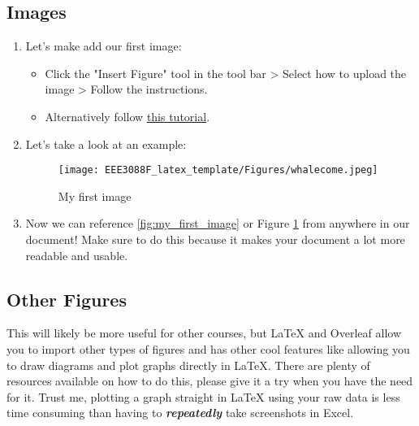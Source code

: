 \documentclass[class=report,11pt,crop=false]{standalone}
\begin{document}
\subsection{Images}
\begin{enumerate}
    \item Let's make add our first image:
        \begin{itemize}
            \item Click the "Insert Figure" tool in the tool bar > Select how to upload the image > Follow the instructions.
            \item Alternatively follow \href{https://www.overleaf.com/learn/latex/Inserting_Images}{this tutorial}.
        \end{itemize}
    \item Let's take a look at an example:        
            \begin{figure}
                \centering
                \texttt{[image: EEE3088F\_latex\_template/Figures/whalecome.jpeg]}
                \caption{My first image}
                \label{fig:my_first_image}
            \end{figure}
    \item Now we can reference \autoref{fig:my_first_image} or Figure \ref{fig:my_first_image} from anywhere in our document! Make sure to do this because it makes your document a lot more readable and usable.        
\end{enumerate}

\subsection{Other Figures}
This will likely be more useful for other courses, but LaTeX and Overleaf allow you to import other types of figures and has other cool features like allowing you to draw diagrams and plot graphs directly in LaTeX. There are plenty of resources available on how to do this, please give it a try when you have the need for it. Trust me, plotting a graph straight in LaTeX using your raw data is less time consuming than having to \textit{\textbf{repeatedly}} take screenshots in Excel. 
\end{document}

